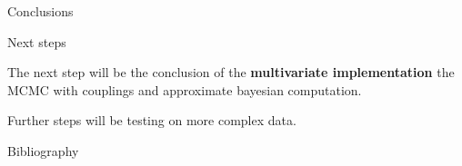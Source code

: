 \documentclass{beamer}
\begin{document}
\begin{section}{Conclusions}
	
    \begin{frame}[plain]{}
		\sectionpage
	\end{frame}

	\begin{frame}{Next steps}
	
		The next step will be the conclusion of the \textbf{multivariate implementation} the MCMC with couplings and approximate bayesian computation.
		
		\vspace{0.5 cm}
		Further steps will be testing on more complex data.
	\end{frame}

	\begin{frame}{Bibliography}
		\nocite{*}
		
		\tiny{  }

	

	\end{frame}
\end{section}
\end{document}
